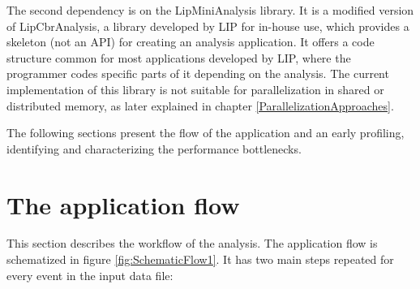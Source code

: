 The second dependency is on the LipMiniAnalysis library. It is a modified version of LipCbrAnalysis, a library developed by LIP for in-house use, which provides a skeleton (not an API) for creating an analysis application. It offers a code structure common for most applications developed by LIP, where the programmer codes specific parts of it depending on the analysis. The current implementation of this library is not suitable for parallelization in shared or distributed memory, as later explained in chapter \ref{ParallelizationApproaches}.

The following sections present the flow of the application and an early profiling, identifying and characterizing the performance bottlenecks.

\section{The \tth application flow}
\label{Application:Flow}

This section describes the workflow of the \tth analysis. The application flow is schematized in figure \ref{fig:SchematicFlow1}. It has two main steps repeated for every event in the input data file: 

